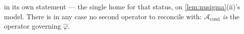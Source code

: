 \begin{remark}
{in its own statement} --- the single home for that status, on \cref{lem:nusigma}\textup{(ii)}'s model.
There is in any case no second operator to reconcile with:
$\mathcal A_{\mathrm{cond}}$ \emph{is} the operator governing $\hat\varphi$.


\end{remark}

